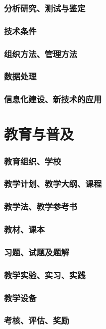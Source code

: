 \documentclass[UTF8]{../ApplicationUniverse}
\begin{document}
    \subsubsection{分析研究、测试与鉴定}
    \subsubsection{技术条件}
    \subsubsection{组织方法、管理方法}
    \subsubsection{数据处理}
    \subsubsection{信息化建设、新技术的应用}
\section{教育与普及}
    \subsubsection{教育组织、学校}
    \subsubsection{教学计划、教学大纲、课程}
    \subsubsection{教学法、教学参考书}
    \subsubsection{教材、课本}
    \subsubsection{习题、试题及题解}
    \subsubsection{教学实验、实习、实践}
    \subsubsection{教学设备}
    \subsubsection{考核、评估、奖励}
\end{document}
